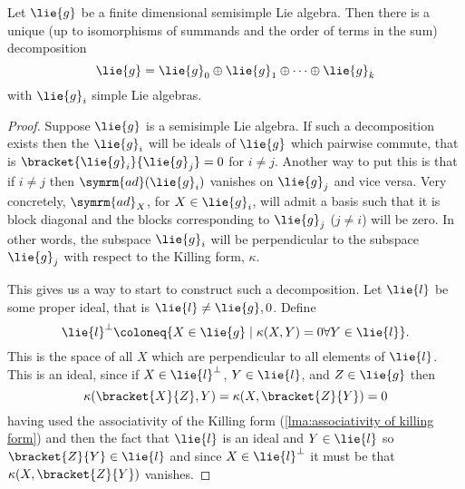 \documentclass[fleqn]{NotesClass}
\newcommand{\ad}{\symrm{ad}}
\begin{document}
    \begin{thm}{}{}
        Let \(\lie{g}\) be a finite dimensional semisimple Lie algebra.
        Then there is a unique (up to isomorphisms of summands and the order of terms in the sum) decomposition
        \begin{equation}
            \lie{g} = \lie{g}_0 \oplus \lie{g}_1 \oplus \dotsb \oplus \lie{g}_k
        \end{equation}
        with \(\lie{g}_i\) simple Lie algebras.
        \begin{proof}
            Suppose \(\lie{g}\) is a semisimple Lie algebra.
            If such a decomposition exists then the \(\lie{g}_i\) will be ideals of \(\lie{g}\) which pairwise commute, that is \(\bracket{\lie{g}_i}{\lie{g}_j} = 0\) for \(i \ne j\).
            Another way to put this is that if \(i \ne j\) then \(\ad(\lie{g}_i)\) vanishes on \(\lie{g}_j\) and vice versa.
            Very concretely, \(\ad_X\), for \(X \in \lie{g}_i\), will admit a basis such that it is block diagonal and the blocks corresponding to \(\lie{g}_j\) (\(j \ne i\)) will be zero.
            In other words, the subspace \(\lie{g}_i\) will be perpendicular to the subspace \(\lie{g}_j\) with respect to the Killing form, \(\kappa\).
            
            This gives us a way to start to construct such a decomposition.
            Let \(\lie{l}\) be some proper ideal, that is \(\lie{l} \ne \lie{g}, 0\).
            Define
            \begin{equation}
                \lie{l}^{\perp} \coloneq \{X \in \lie{g} \mid \kappa(X, Y) = 0 \forall Y \in \lie{l}\}.
            \end{equation}
            This is the space of all \(X\) which are perpendicular to all elements of \(\lie{l}\).
            This is an ideal, since if \(X \in \lie{l}^{\perp}\), \(Y \in \lie{l}\), and \(Z \in \lie{g}\) then
            \begin{equation}
                \kappa(\bracket{X}{Z}, Y) = \kappa(X, \bracket{Z}{Y}) = 0
            \end{equation}
            having used the associativity of the Killing form (\cref{lma:associativity of killing form}) and then the fact that \(\lie{l}\) is an ideal and \(Y \in \lie{l}\) so \(\bracket{Z}{Y} \in \lie{l}\) and since \(X \in \lie{l}^{\perp}\) it must be that \(\kappa(X, \bracket{Z}{Y})\) vanishes.
            

\end{proof}
\end{thm}
\end{document}
